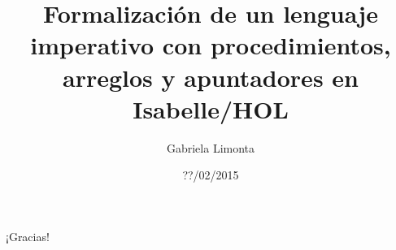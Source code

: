 \documentclass{beamer}
\title[Formalización de un lenguaje imperativo]{Formalización de un lenguaje imperativo con procedimientos, arreglos y apuntadores en Isabelle/HOL}
\author{Gabriela Limonta}
\institute[]{Universidad Simón Bolívar}
\date{??/02/2015}
\newcommand\Fontbi{\fontsize{12}{10}\selectfont}
\begin{document}
\begin{frame}
\titlepage
\end{frame}









\begin{frame}

\Fontbi

\begin{center}
¡Gracias!
\end{center}
\end{frame}
\end{document}
